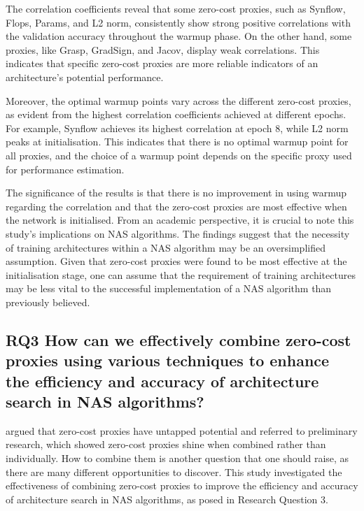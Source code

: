 The correlation coefficients reveal that some zero-cost proxies, such as \gls{Synflow}, Flops, Params, and L2 norm, consistently show strong positive correlations with the validation accuracy throughout the warmup phase. On the other hand, some proxies, like Grasp, GradSign, and Jacov, display weak correlations. This indicates that specific zero-cost proxies are more reliable indicators of an architecture's potential performance.

Moreover, the optimal warmup points vary across the different zero-cost proxies, as evident from the highest correlation coefficients achieved at different epochs. For example, \gls{Synflow} achieves its highest correlation at epoch 8, while L2 norm peaks at initialisation. This indicates that there is no optimal warmup point for all proxies, and the choice of a warmup point depends on the specific proxy used for performance estimation.

The significance of the results is that there is no improvement in using warmup regarding the correlation and that the zero-cost proxies are most effective when the network is initialised. From an academic perspective, it is crucial to note this study's implications on \gls{NAS} algorithms. The findings suggest that the necessity of training architectures within a \gls{NAS} algorithm may be an oversimplified assumption. Given that zero-cost proxies were found to be most effective at the initialisation stage, one can assume that the requirement of training architectures may be less vital to the successful implementation of a \gls{NAS} algorithm than previously believed.

\subsection{RQ3 How can we effectively combine zero-cost proxies using various techniques to enhance the efficiency and accuracy of architecture search in NAS algorithms?}

\cite{colin2022adeeperlook} argued that zero-cost proxies have untapped potential and referred to preliminary research, which showed zero-cost proxies shine when combined rather than individually. How to combine them is another question that one should raise, as there are many different opportunities to discover. This study investigated the effectiveness of combining zero-cost proxies to improve the efficiency and accuracy of architecture search in \gls{NAS} algorithms, as posed in Research Question 3. 

